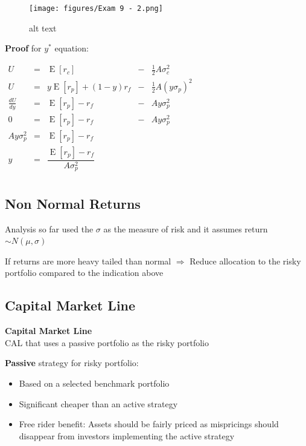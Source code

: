 \documentclass[]{book}
\providecommand{\tightlist}{%
  \setlength{\itemsep}{0pt}\setlength{\parskip}{0pt}}
\theoremstyle{definition}
\theoremstyle{definition}
\theoremstyle{remark}
\begin{document}
\begin{figure}[htbp]
\centering
\texttt{[image: figures/Exam 9 - 2.png]}
\caption{alt text}
\end{figure}

\textbf{Proof} for \(y^*\) equation:

\(\begin{array}{lcccl}  U &= &\operatorname{E}[r_c] &- &\frac{1}{2}A\sigma_c^2 \\  U &= &y \operatorname{E}[r_p] + (1-y)r_f &- &\frac{1}{2}A(y\sigma_p)^2 \\  \frac{dU}{dy} &= &\operatorname{E}[r_p] - r_f &- & A y \sigma^2_p \\  0 &= &\operatorname{E}[r_p] - r_f &- & A y \sigma^2_p \\  A y \sigma^2_p &= &\operatorname{E}[r_p] - r_f \\  y &= &\dfrac{\operatorname{E}[r_p] - r_f}{A \sigma^2_p } \\ \end{array}\)

\subsection{Non Normal Returns}\label{non-normal-returns}

Analysis so far used the \(\sigma\) as the measure of risk and it
assumes return \(\sim N(\mu, \sigma)\)

If returns are more heavy tailed than normal \(\Rightarrow\) Reduce
allocation to the risky portfolio compared to the indication above

\subsection{Capital Market Line}\label{capital-market-line}

\textbf{Capital Market Line}\\
CAL that uses a passive portfolio as the risky portfolio

\textbf{Passive} strategy for risky portfolio:

\begin{itemize}
\tightlist
\item
  Based on a selected benchmark portfolio
\item
  Significant cheaper than an active strategy
\item
  Free rider benefit: Assets should be fairly priced as mispricings
  should disappear from investors implementing the active strategy
\end{itemize}
\end{document}
